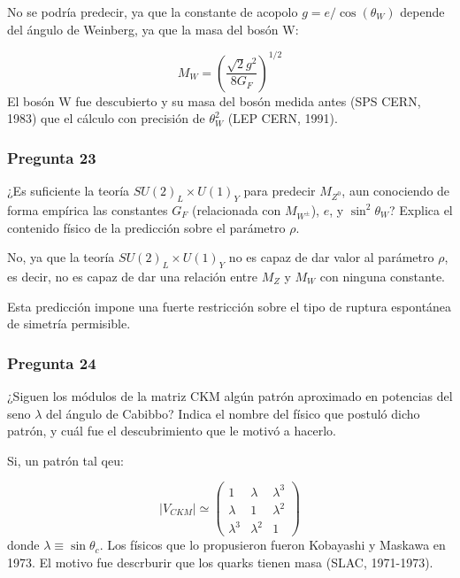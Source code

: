 No se podría predecir, ya que la constante de acopolo $g=e/\cos(\theta_W)$ depende del ángulo de Weinberg, ya que la masa del bosón W:

\begin{equation}
	M_W = \left( \frac{\sqrt{2}g^2}{8G_F} \right)^{1/2}
\end{equation}
El bosón W fue descubierto y su masa del bosón medida antes (SPS CERN, 1983) que el cálculo con precisión de $\theta_W^2$ (LEP CERN, 1991).


\begin{Enunciado}
	\subsubsection*{Pregunta 23}

	¿Es suficiente la teoría $SU(2)_L \times U(1)_Y$ para predecir $M_{Z^0}$, aun conociendo de forma empírica las constantes $G_F$ (relacionada con $M_{W^\pm}$), $e$, y $\sin^2\theta_W$? Explica el contenido físico de la predicción sobre el parámetro $\rho$.

\end{Enunciado}

No, ya que la teoría $SU(2)_L \times U(1)_Y$ no es capaz de dar valor al parámetro $\rho$, es decir, no es capaz de dar una relación entre $M_Z$ y $M_W$ con ninguna constante.

Esta predicción impone una fuerte restricción sobre el tipo de ruptura espontánea de simetría permisible.

\begin{Enunciado}
	\subsubsection*{Pregunta 24}

	¿Siguen los módulos de la matriz CKM algún patrón aproximado en potencias del seno $\lambda$ del ángulo de Cabibbo? Indica el nombre del físico que postuló dicho patrón, y cuál fue el descubrimiento que le motivó a hacerlo.

\end{Enunciado}

Si, un patrón tal qeu:

\begin{equation}
	|V_{CKM}| \simeq \begin{pmatrix}
		1         & \lambda   & \lambda^3 \\
		\lambda   & 1         & \lambda^2 \\
		\lambda^3 & \lambda^2 & 1
	\end{pmatrix}
\end{equation}
donde $\lambda\equiv \sin \theta_c$. Los físicos que lo propusieron fueron Kobayashi y Maskawa en 1973. El motivo fue descrburir que los quarks tienen masa (SLAC, 1971-1973).



